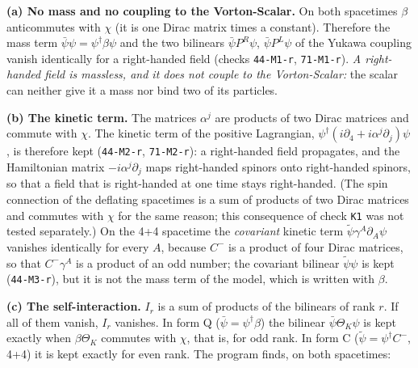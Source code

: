 \documentclass[
  10pt,
]{article}
\begin{document}
\textbf{(a) No mass and no coupling to the Vorton-Scalar.} On both
spacetimes \(\beta\) anticommutes with \(\chi\) (it is one Dirac matrix
times a constant). Therefore the mass term
\(\bar\psi\psi=\psi^\dagger\beta\psi\) and the two bilinears
\(\bar\psi P^R\psi\), \(\bar\psi P^L\psi\) of the Yukawa coupling vanish
identically for a right-handed field (checks \texttt{44-M1-r},
\texttt{71-M1-r}). \emph{A right-handed field is massless, and it does
not couple to the Vorton-Scalar:} the scalar can neither give it a mass
nor bind two of its particles.

\textbf{(b) The kinetic term.} The matrices \(\alpha^j\) are products of
two Dirac matrices and commute with \(\chi\). The kinetic term of the
positive Lagrangian,
\(\psi^\dagger(i\partial_4+i\alpha^j\partial_j)\psi\), is therefore kept
(\texttt{44-M2-r}, \texttt{71-M2-r}): a right-handed field propagates,
and the Hamiltonian matrix \(-i\alpha^j\partial_j\) maps right-handed
spinors onto right-handed spinors, so that a field that is right-handed
at one time stays right-handed. (The spin connection of the deflating
spacetimes is a sum of products of two Dirac matrices and commutes with
\(\chi\) for the same reason; this consequence of check \texttt{K1} was
not tested separately.) On the 4+4 spacetime the \emph{covariant}
kinetic term \(\tilde\psi\gamma^A\partial_A\psi\) vanishes identically
for every \(A\), because \(C^-\) is a product of four Dirac matrices, so
that \(C^-\gamma^A\) is a product of an odd number; the covariant
bilinear \(\tilde\psi\psi\) is kept (\texttt{44-M3-r}), but it is not
the mass term of the model, which is written with \(\beta\).

\textbf{(c) The self-interaction.} \(I_r\) is a sum of products of the
bilinears of rank \(r\). If all of them vanish, \(I_r\) vanishes. In
form Q (\(\bar\psi=\psi^\dagger\beta\)) the bilinear
\(\bar\psi\Theta_K\psi\) is kept exactly when \(\beta\Theta_K\) commutes
with \(\chi\), that is, for odd rank. In form C
(\(\tilde\psi=\psi^\dagger C^-\), 4+4) it is kept exactly for even rank.
The program finds, on both spacetimes:
\end{document}
